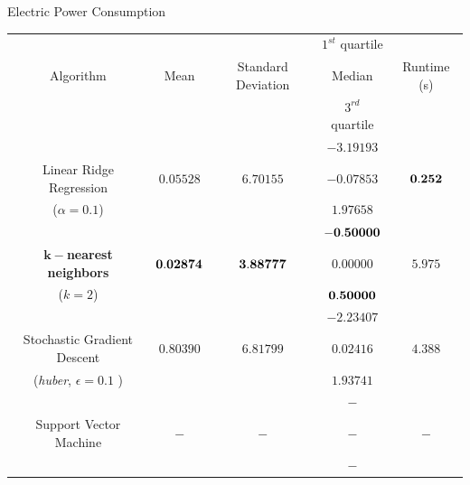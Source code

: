 \begin{frame}{Electric Power Consumption}
\begin{tcolorbox}[colback=LightSteelBlue!5,colframe=yellow!40!black,title=Final
Comparison]


\begin{table}
\centering
\resizebox{\columnwidth}{!}
	{
		\begin{tabular}{|c|c|c|c|c|}
					\hline  &&& $1^{st}$ quartile
					&\\{Algorithm}&Mean&Standard Deviation&Median& Runtime (s)\\&&& $3^{rd}$
					quartile &\\
					\hline &&&$-3.19193$&\\
					{Linear Ridge
		Regression}& $0.05528$ & $6.70155$  & $-0.07853$ & $\bf {0.252}$\\
					 ($\alpha = 0.1$)&&&$1.97658$& \\
					\hline &&&$\bf {-0.50000}$&\\
					\bf {{$\mathbf {k-}$nearest neighbors}}& $\bf {0.02874}$ & $\bf {3.88777}$ 
					& $0.00000$ & $5.975$\\
					 ($k = 2$)&&&$\bf {0.50000}$& \\
					\hline &&&$-2.23407$&\\
					{Stochastic Gradient Descent }& $0.80390$ & $6.81799$  & $0.02416$ &
					$4.388$\\
					({\it huber}, $\epsilon = 0.1$ )&&&$1.93741$& \\
					\hline &&&$-$&\\
					{Support Vector Machine }& $-$ & $-$  & $-$ &
					$-$\\
					&&& $-$ & \\
					\hline

		\end{tabular}
	}



\end{table}



\end{tcolorbox}
\end{frame}

